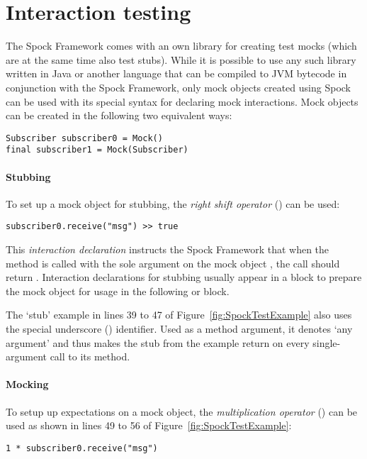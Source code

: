 \section{Interaction testing}
The Spock Framework comes with an own library
for creating test mocks
(which are at the same time also test stubs).
While it is possible to use any such library
written in Java or another language
that can be compiled to JVM bytecode
in conjunction with the Spock Framework,
only mock objects created using Spock
can be used with its special syntax
for declaring mock interactions.
Mock objects can be created in the following two equivalent ways:
\autocite[Chapter: Interaction Based Testing - Creating Mock Objects]{SpockFrameworkDoc}
\begin{verbatim}
Subscriber subscriber0 = Mock()
final subscriber1 = Mock(Subscriber)
\end{verbatim}

\paragraph{Stubbing}
To set up a mock object for stubbing,
the \textit{right shift operator} (\code{<<}) can be used:
\begin{verbatim}
subscriber0.receive("msg") >> true
\end{verbatim}

This \textit{interaction declaration} instructs the Spock Framework that when
the method  is called with
the sole argument  on
the mock object ,
the call should return .
Interaction declarations for stubbing usually appear in a  block
to prepare the mock object for usage in the following  or  block.

The `stub' example
in lines 39 to 47 of Figure~\ref{fig:SpockTestExample}
also uses the special underscore (\code{_}) identifier.
Used as a method argument, it denotes `any argument'
and thus makes the stub from the example return 
on every single-argument call to its  method.

\paragraph{Mocking}
To setup up expectations on a mock object,
the \textit{multiplication operator} (\code{*}) can be used as shown
in lines 49 to 56 of Figure~\ref{fig:SpockTestExample}:
\begin{verbatim}
1 * subscriber0.receive("msg")
\end{verbatim}

